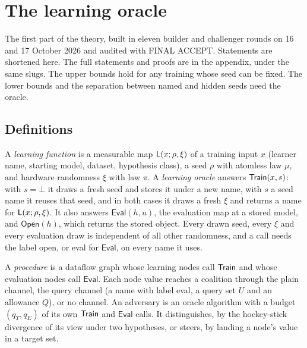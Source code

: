 \chapter{The learning oracle}\label{ch:learning-oracle}
The first part of the theory, built in eleven builder and challenger rounds on
16 and 17 October 2026 and audited with FINAL ACCEPT. Statements are shortened
here. The full statements and proofs are in the appendix, under the same slugs.
The upper bounds hold for any training whose seed can be fixed. The lower bounds
and the separation between named and hidden seeds need the oracle.

\section{Definitions}

\begin{definition}
A \emph{learning function} is a measurable map $\mathsf{L}(x;\rho,\xi)$ of a training
input $x$ (learner name, starting model, dataset, hypothesis class), a seed $\rho$
with atomless law $\mu$, and hardware randomness $\xi$ with law $\pi$. A
\emph{learning oracle} answers $\mathsf{Train}(x,s)$: with $s=\bot$ it draws a fresh seed
and stores it under a new name, with $s$ a seed name it reuses that seed, and in
both cases it draws a fresh $\xi$ and returns a name for $\mathsf{L}(x;\rho,\xi)$. It also
answers $\mathsf{Eval}(h,u)$, the evaluation map at a stored model, and
$\mathsf{Open}(h)$, which returns the stored object. Every drawn seed, every $\xi$
and every evaluation draw is independent of all other randomness, and a call
needs the label open, or eval for $\mathsf{Eval}$, on every name it uses.
\end{definition}

\begin{definition}
A \emph{procedure} is a dataflow graph whose learning nodes call $\mathsf{Train}$ and whose
evaluation nodes call $\mathsf{Eval}$. Each node value reaches a coalition through
the plain channel, the query channel (a name with label eval, a query set $U$ and
an allowance $Q$), or no channel. An adversary is an oracle algorithm with a budget
$(q_T,q_E)$ of its own $\mathsf{Train}$ and $\mathsf{Eval}$ calls. It distinguishes, by
the hockey-stick divergence of its view under two hypotheses, or steers, by
landing a node's value in a target set.
\end{definition}

